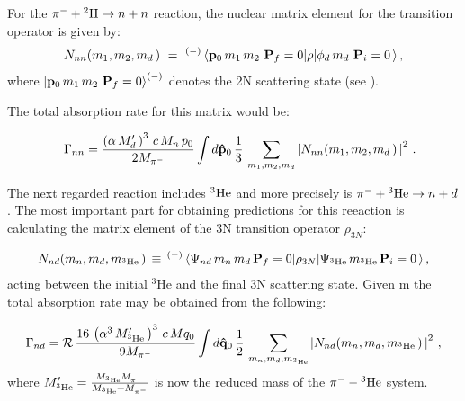     For the $\pi^- + {^2{\rm H}} \rightarrow n + n $ reaction,
    the nuclear matrix element for the transition operator is given by:
    \begin{eqnarray}
        N_{nn} (m_1, m_2, m_d \, ) \ = \
   ^{(-)}\matrixel{ {\bf p}_0 \, m_{1} \, m_2 \ {\bf P}_f=0 } 
   {\rho } {\phi_d \, m_d \ {\bf P}_i=0 \, },
   \label{nnn1}
   \end{eqnarray}
   where $ \ket{  {\bf p}_0 \, m_{1} \, m_2 \ {\bf P}_f=0  }^{(-)}  $ denotes the 2N scattering state (see \cite{Golak2018}).

   The total absorption rate for this matrix would be:

   \begin{eqnarray}
        &&\Gamma_{nn} = 
    \frac{ \left( \alpha \, M^\prime_d \, \right)^3 \, c \, M_n \, p_0 }{ 2 M_{\pi^-} }
        \int d {\bf\hat p}_0 \,
        \frac13 \, 
        \sum\limits_{m_1, m_2, m_d} 
        \left| 
        N_{nn} (m_1, m_2, m_d \, ) \, 
        \right|^2  \, .
    \label{gnn1}
    \end{eqnarray} 

    The next regarded reaction includes $^3{\rm He}$ and 
    more precisely is $\pi^- + {^3{\rm He}} \rightarrow n + d $. The most important part for 
    obtaining predictions for this reeaction is calculating
    the matrix element
    of the 3N transition operator $\rho_{3N}$:

    \begin{eqnarray}  
        N_{nd} (m_n, m_d , m_{^3{\rm He}}  \, )  \, \equiv \, 
        {}^{(-)}\matrixel{\Psi_{nd}  \, 
            m_n \, m_d \,
            {\bf P}_f=0 
            } {\rho_{3N} }
        {\Psi_{^3{\rm He}} \, m_{^3{\rm He}} \, {\bf P}_i=0 \, },
        \label{nnd}
    \end{eqnarray}
    acting between the initial $^3$He and the final 3N scattering state. Given m the total absorption 
    rate may be obtained from the following:

    \begin{equation}
        \Gamma_{nd} = 
     {\cal R} \, \frac{ 16 \, \left( \alpha^3 \, M^\prime_{^3{\rm He}} \, \right)^3  \, c \, M q_0 }{ 9 M_{\pi^-}  }
          \int d {\bf\hat q}_0 \,
          \frac12 \, 
         \sum\limits_{m_n, m_d, m_{^3{\rm He}}} 
         \left| 
         N_{nd} (m_n, m_d, m_{^3{\rm He}} \, ) \, 
         \right|^2  \, ,  %
    \label{gnd}
    \end{equation}  
    where
    $ M^\prime_{^3{\rm He}}  = \frac { M_{^3{\rm He}} M_{\pi^-} } { M_{^3{\rm He}} + M_{\pi^-} }$
    is now the reduced mass of the $\pi^- - {^3{\rm He}}$ system.

